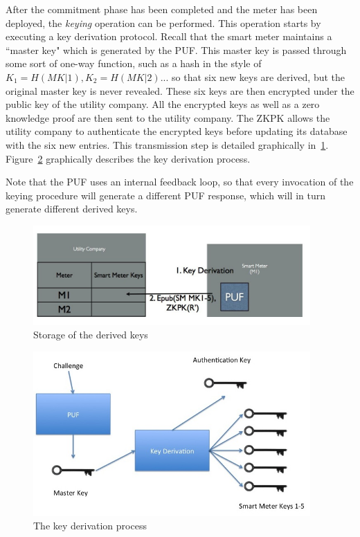 After the commitment phase has been completed and the meter has been deployed, the \textit{keying} operation
can be performed. This operation starts by executing a key derivation protocol. Recall that the smart meter 
maintains a ``master key" which is generated by the PUF. 
This master key is passed through some sort of one-way function, such as a hash
in the style of $K_1=H(MK|1), K_2=H(MK|2)...$ so that six new keys are derived, but the original master key is
never revealed. These six keys are then
encrypted under the public key of the utility company. All the encrypted keys as well as a zero knowledge proof
are then sent to the utility company. The ZKPK allows the utility company to authenticate the encrypted keys before
updating its database with the six new entries. This transmission step is detailed graphically in~\ref{fig:doeusage}.
Figure~\ref{fig:keyderivation} graphically describes the key derivation process.

Note that the PUF uses an internal feedback loop, so that every invocation of the keying procedure will generate a
different PUF response, which will in turn generate different derived keys.

\begin{figure}[!ht]
\centering
\includegraphics[width=400px]{images/doe_key_config.jpg}
\caption{Storage of the derived keys}
\label{fig:doeusage}
\vspace{-20pt}
\end{figure}
\FloatBarrier

\begin{figure}[!ht]
\centering
\includegraphics[width=400px]{images/keyderivation.jpg}
\caption{The key derivation process}
\label{fig:keyderivation}
\vspace{-25pt}
\end{figure}
\FloatBarrier


